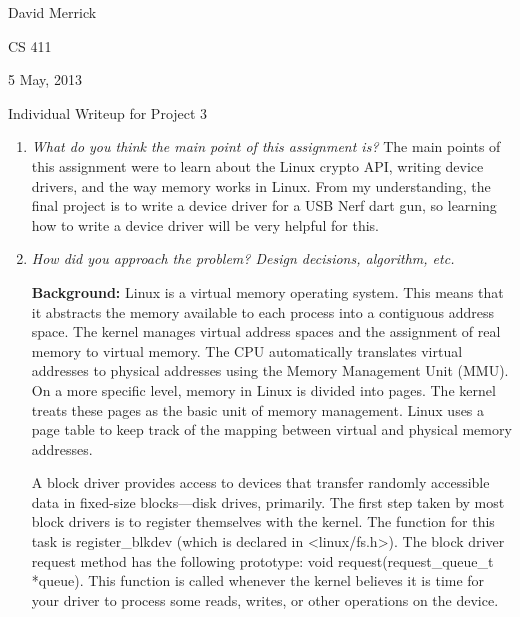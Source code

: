 \documentclass[letterpaper,10pt,titlepage]{article}
\newcommand{\ignore}[2]{\hspace{0in}#2} %
\newcommand{\tab}{\hspace*{2em}} %
\def\name{David Merrick}
\def\project{Project 3}
\def\date{5 May, 2013}
\begin{document}
\name

CS 411

\date

\begin{center}
{\LARGE Individual Writeup for \project}
\end{center}

\begin{enumerate} 
\item \emph{What do you think the main point of this assignment is?}
The main points of this assignment were to learn about the Linux crypto API, writing device drivers, and the way memory works in Linux. From my understanding, the final project is to write a device driver for a USB Nerf dart gun, so learning how to write a device driver will be very helpful for this.

\item \emph{How did you approach the problem? Design decisions, algorithm, etc.}

\tab \textbf{Background:} 
\tab Linux is a virtual memory operating system. This means that it abstracts the memory available to each process into a contiguous address space. The kernel manages virtual address spaces and the assignment of real memory to virtual memory. The CPU automatically translates virtual addresses to physical addresses using the Memory Management Unit (MMU)\ignore{source:http://en.wikipedia.org/wiki/Virtual_memory}. On a more specific level, memory in Linux is divided into pages. The kernel treats these pages as the basic unit of memory management\ignore{source:Love pg. 231}. Linux uses a page table to keep track of the mapping between virtual and physical memory addresses.

\tab A block driver provides access to devices that transfer randomly accessible data in fixed-size blocks—disk drives, primarily. The first step taken by most block drivers is to register themselves with the kernel. The function for this task is register\_blkdev (which is declared in <linux/fs.h>). The block driver request method has the following prototype: void request(request_queue_t *queue). This function is called whenever the kernel believes it is time for your driver to process some reads, writes, or other operations on the device\ignore{source: http://lwn.net/images/pdf/LDD3/ch16.pdf}. 


\end{enumerate}
\end{document}
